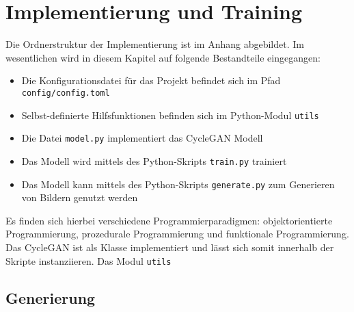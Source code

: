 \chapter{Implementierung und Training}

Die Ordnerstruktur der Implementierung ist im Anhang abgebildet. Im wesentlichen wird in diesem Kapitel auf folgende Bestandteile eingegangen:
\begin{itemize}
   \item Die Konfigurationsdatei für das Projekt befindet sich im Pfad \lstinline{config/config.toml}
   \item Selbst-definierte Hilfsfunktionen befinden sich im Python-Modul \lstinline{utils}
   \item Die Datei \lstinline{model.py} implementiert das \ac{CycleGAN} Modell
   \item Das Modell wird mittels des Python-Skripts \lstinline{train.py} trainiert
   \item Das Modell kann mittels des Python-Skripts \lstinline{generate.py} zum Generieren von Bildern genutzt werden
\end{itemize}

Es finden sich hierbei verschiedene Programmierparadigmen: objektorientierte Programmierung, prozedurale Programmierung und funktionale Programmierung. Das \ac{CycleGAN} ist als Klasse implementiert und lässt sich somit innerhalb der Skripte instanziieren. Das Modul \lstinline{utils} 







\section{Generierung}